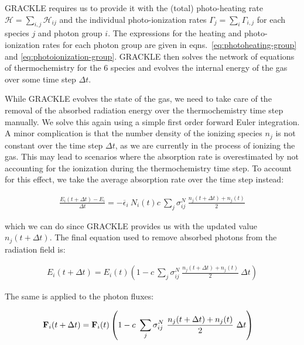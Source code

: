GRACKLE requires us to provide it with the (total) photo-heating rate $\mathcal{H} =
\sum_{i,j} \mathcal{H}_{ij}$ and the individual photo-ionization rates $\Gamma_{j} = \sum_i
\Gamma_{i,j}$ for each species $j$ and photon group $i$. The expressions for the heating and
photo-ionization rates for each photon group are given in eqns.~\ref{eq:photoheating-group} and
\ref{eq:photoionization-group}. GRACKLE then solves the network of equations of thermochemistry for the
6 species and evolves the internal energy of the gas over some time step
$\Delta t$.

While GRACKLE evolves the state of the gas, we need to take care of the removal of the absorbed
radiation energy over the thermochemistry time step manually. We solve this again using a simple
first order forward Euler integration. A minor complication is that the number density of the
ionizing species $n_j$ is not constant over the time step $\Delta t$, as we are currently in the
process of ionizing the gas. This may lead to scenarios where the absorption rate is overestimated
by not accounting for the ionization during the thermochemistry time step. To account for this
effect, we take the average absorption rate over the time step instead:


\begin{align*}
    \frac{E_i (t + \Delta t) - E_i}{\Delta t}
        = -\overline{\epsilon}_i \ N_i(t) c \ \sum_j \sigma_{i j} ^ N  \
    \frac{n_j(t + \Delta t) + n_j(t)}{2}
\end{align*}

which we can do since GRACKLE provides us with the updated value $n_j(t + \Delta t)$.
The final equation used to remove absorbed photons from the radiation field is:

\begin{align}
E_i (t + \Delta t)
    = E_i(t) \left(1 - c \ \sum_j \sigma_{i j} ^ N  \
    \frac{n_j(t + \Delta t) + n_j(t)}{2} \ \Delta t \right)
\end{align}

The same is applied to the photon fluxes:

\begin{align}
\mathbf{F}_i (t + \Delta t)
    &= \mathbf{F}_i(t) \left(1 - c \ \sum_j \sigma_{i j} ^ N  \
    \frac{n_j(t + \Delta t) + n_j(t)}{2} \ \Delta t \right)
\end{align}






















